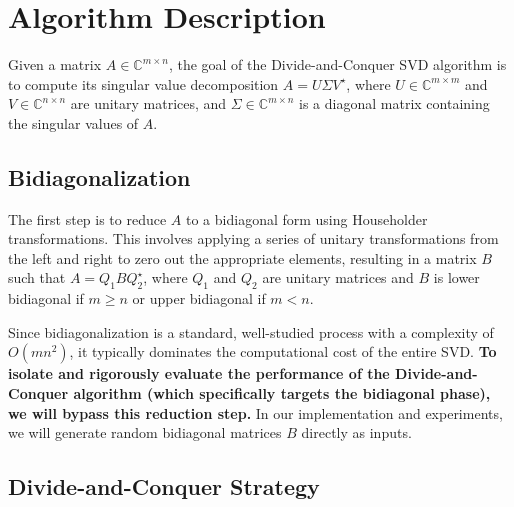 \documentclass[12pt]{article}
\newcommand{\C}{\mathbb{C}}
\begin{document}
\section{Algorithm Description}

Given a matrix \(A \in \C^{m \times n}\), the goal of the Divide-and-Conquer SVD algorithm is to compute its singular value decomposition \(A = U \Sigma V^{\star}\), where \(U \in \C^{m \times m}\) and \(V \in \C^{n \times n}\) are unitary matrices, and \(\Sigma \in \C^{m \times n}\) is a diagonal matrix containing the singular values of \(A\).

\subsection{Bidiagonalization}

The first step is to reduce \(A\) to a bidiagonal form using Householder transformations. This involves applying a series of unitary transformations from the left and right to zero out the appropriate elements, resulting in a matrix \(B\) such that \(A = Q_1 B Q_2^{\star}\), where \(Q_1\) and \(Q_2\) are unitary matrices and \(B\) is lower bidiagonal if \(m \geq n\) or upper bidiagonal if \(m < n\).

Since bidiagonalization is a standard, well-studied process with a complexity of \(O(mn^2)\), it typically dominates the computational cost of the entire SVD. \textbf{To isolate and rigorously evaluate the performance of the Divide-and-Conquer algorithm (which specifically targets the bidiagonal phase), we will bypass this reduction step.} In our implementation and experiments, we will generate random bidiagonal matrices \(B\) directly as inputs.

\subsection{Divide-and-Conquer Strategy}
\end{document}
